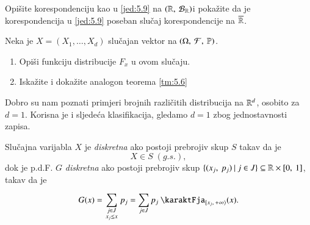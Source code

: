 \begin{zad} \label{zad:5.10}
    Opi\v site korespondenciju kao u \eqref{jed:5.9} na $({\mathbb{R}}, \: {\mathcal{B}_{\mathbb{R}}})$i poka\v zite da je korespondencija u \eqref{jed:5.9} poseban slu\v caj korespondencije na $\overline{\mathbb{R}}$.
\end{zad}

\begin{zad} \label{zad:5.11}
    Neka je $X = (X_1, \ldots, X_d)$ slu\v cajan vektor na $(\Omega, \: \mathcal{F}, \: \mathbb{P})$.
    \begin{enumerate}[label=(\alph*)]
        \item Opi\v si funkciju distribucije $F_x$ u ovom slu\v caju.
        \item Iska\v zite i doka\v zite analogon teorema \ref{tm:5.6}
    \end{enumerate}
\end{zad}

Dobro su nam poznati primjeri brojnih razli\v citih distribucija na $\mathbb{R}^d$, osobito za $d = 1$.
Korisna je i sljede\' ca klasifikacija, gledamo $d = 1$ zbog jednostavnosti zapisa.

\begin{defn}    \label{defn:5.11-1}
    Slu\v cajna varijabla $X$ je \emph{diskretna} ako postoji prebrojiv skup $S$ takav da je
    \begin{equation*}
        X \in S \; (g.s.),
    \end{equation*}
    dok je p.d.F. $G$ \emph{diskretna} ako postoji prebrojiv skup $\{{({x_j}, \: {p_j})} \: | \: {j \in J}\} \subseteq \mathbb{R} \times [{0}, \:{1}]$, takav da je
    \begin{equation*}
        G(x) = \suma{
            \begin{smallmatrix}
                j \in J\\
                x_j \leq x
            \end{smallmatrix}
            }{} p_j = \suma{j \in J}{} p_j \: \karaktFja_{\desInt{x_j}{+\infty}} (x).
    \end{equation*}
\end{defn}

